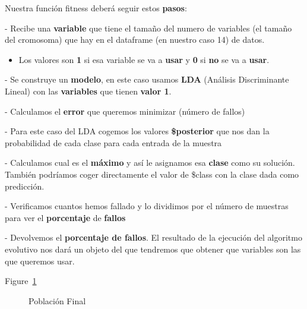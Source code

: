 \documentclass[
  a4paper,
  DIV=11,
  numbers=noendperiod]{scrreprt}
\providecommand{\tightlist}{%
  \setlength{\itemsep}{0pt}\setlength{\parskip}{0pt}}\usepackage{longtable,booktabs,array}
\begin{document}
Nuestra función fitness deberá seguir estos \textbf{pasos}:

- Recibe una \textbf{variable} que tiene el tamaño del numero de
variables (el tamaño del cromosoma) que hay en el dataframe (en nuestro
caso 14) de datos.

\begin{itemize}
\tightlist
\item
  Los valores son \textbf{1} si esa variable se va a \textbf{usar} y
  \textbf{0} si \textbf{no} se va a \textbf{usar}.
\end{itemize}

- Se construye un \textbf{modelo}, en este caso usamos \textbf{LDA}
(Análisis Discriminante Lineal) con las \textbf{variables} que tienen
\textbf{valor 1}.

- Calculamos el \textbf{error} que queremos minimizar (número de fallos)

- Para este caso del LDA cogemos los valores \textbf{\$posterior} que
nos dan la probabilidad de cada clase para cada entrada de la muestra

- Calculamos cual es el \textbf{máximo} y así le asignamos esa
\textbf{clase} como su solución. También podríamos coger directamente el
valor de \$class con la clase dada como predicción.

- Verificamos cuantos hemos fallado y lo dividimos por el número de
muestras para ver el \textbf{porcentaje} de \textbf{fallos}

- Devolvemos el \textbf{porcentaje de fallos}. El resultado de la
ejecución del algoritmo evolutivo nos dará un objeto del que tendremos
que obtener que variables son las que queremos usar.

Figure~\ref{fig-poblacion_final}

\begin{figure}


\caption{\label{fig-poblacion_final}Población Final}

\end{figure}%
\end{document}
